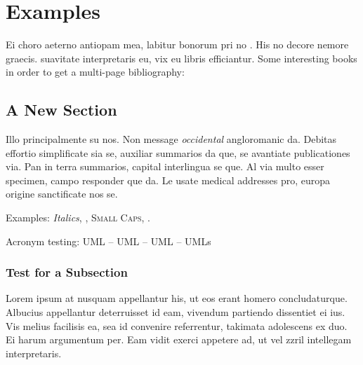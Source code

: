 \documentclass[../thesis.tex]{subfiles}
\begin{document}
\chapter{Examples}\label{ch:examples}
Ei choro aeterno antiopam mea, labitur bonorum pri no
\citeauthor{taleb:2012} \citep{taleb:2012}. His no decore
nemore graecis. %
suavitate interpretaris eu, vix eu libris efficiantur.
 Some interesting books in order to get a multi-page bibliography: \cite{ferriss:2016,greenwald:2014,adams:2013,pausch:2008,aurelius:2002,adams:1996,trump:1987,feynman:1985,cialdini:1984,seneca,orwell:1949,taleb:2010,munger:2008,postman:2005,harari:2014,peterson:2018,taleb:2018,frankl:1959} %



\section{A New Section}
Illo principalmente su nos. Non message \emph{occidental} angloromanic
da. Debitas effortio simplificate sia se, auxiliar summarios da que,
se avantiate publicationes via. Pan in terra summarios, capital
interlingua se que. Al via multo esser specimen, campo responder que
da. Le usate medical addresses pro, europa origine sanctificate nos
se.

Examples: \textit{Italics}, , \textsc{Small
Caps}, .

Acronym testing: \ac{UML} -- \acs{UML} -- \acf{UML} -- \acp{UML}


\subsection{Test for a Subsection}
Lorem ipsum at nusquam appellantur his, ut eos erant homero
concludaturque. Albucius appellantur deterruisset id eam, vivendum
partiendo dissentiet ei ius. Vis melius facilisis ea, sea id convenire
referrentur, takimata adolescens ex duo. Ei harum argumentum per. Eam
vidit exerci appetere ad, ut vel zzril intellegam interpretaris.
\end{document}
